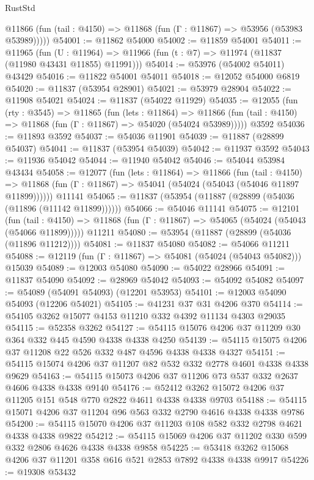 \begin{lexlean}{RustStd}
\begin{coremodule}
{\begin{coremodule}
{{{{{{{{{{{{{{{{{{{{{{{{{{{{{{{{{{{{{{{{{{{{{{{{{{      @11866 (fun (tail : @4150) => @11868 (fun (Γ : @11867) => @53956 (@53983 @53989)))))
@54001 := @11862 @54000
@54002 := @11859 @54001
@54011 := @11965
    (fun (U : @11964) => @11966 (fun (t : @7) => @11974 (@11837 (@11980 @43431 @11855) @11991)))
@54014 := @53976 (@54002 @54011) @43429
@54016 := @11822 @54001 @54011
@54018 := @12052 @54000 @6819
@54020 := @11837 (@53954 @28901)
@54021 := @53979 @28904
@54022 := @11908 @54021
@54024 := @11837 (@54022 @11929)
@54035 := @12055
    (fun (rty : @3545) =>
    @11865
      (fun (lets : @11864) =>
      @11866 (fun (tail : @4150) => @11868 (fun (Γ : @11867) => @54020 (@54024 @53989)))))
    @3592
@54036 := @11893 @3592
@54037 := @54036 @11901
@54039 := @11887 (@28899 @54037)
@54041 := @11837 (@53954 @54039)
@54042 := @11937 @3592
@54043 := @11936 @54042
@54044 := @11940 @54042
@54046 := @54044 @53984 @43434
@54058 := @12077
    (fun (lets : @11864) =>
    @11866
      (fun (tail : @4150) =>
      @11868 (fun (Γ : @11867) => @54041 (@54024 (@54043 (@54046 @11897 @11899))))))
    @11141
@54065 := @11837 (@53954 (@11887 (@28899 (@54036 (@11896 (@11142 @11899))))))
@54066 := @54046 @11141
@54075 := @12101
    (fun (tail : @4150) => @11868 (fun (Γ : @11867) => @54065 (@54024 (@54043 (@54066 @11899)))))
    @11211
@54080 := @53954 (@11887 (@28899 (@54036 (@11896 @11212))))
@54081 := @11837 @54080
@54082 := @54066 @11211
@54088 := @12119 (fun (Γ : @11867) => @54081 (@54024 (@54043 @54082))) @15039
@54089 := @12003 @54080
@54090 := @54022 @28966
@54091 := @11837 @54090
@54092 := @28969 @54042
@54093 := @54092 @54082
@54097 := @54089 (@54091 @54093) (@12201 @53953)
@54101 := @12003 @54090 @54093 (@12206 @54021)
@54105 := @41231 @37 @31 @4206 @370
@54114 := @54105 @3262 @15077 @4153 @11210 @332 @4392 @11134 @4303 @29035
@54115 := @52358 @3262
@54127 := @54115 @15076 @4206 @37 @11209 @30 @364 @332 @445 @4590 @4338 @4338 @4250
@54139 := @54115 @15075 @4206 @37 @11208 @22 @526 @332 @487 @4596 @4338 @4338 @4327
@54151 := @54115 @15074 @4206 @37 @11207 @82 @532 @332 @2778 @4601 @4338 @4338 @9629
@54163 := @54115 @15073 @4206 @37 @11206 @73 @537 @332 @2637 @4606 @4338 @4338 @9140
@54176 := @52412 @3262 @15072 @4206 @37 @11205 @151 @548 @770 @2822 @4611 @4338 @4338 @9703
@54188 := @54115 @15071 @4206 @37 @11204 @96 @563 @332 @2790 @4616 @4338 @4338 @9786
@54200 := @54115 @15070 @4206 @37 @11203 @108 @582 @332 @2798 @4621 @4338 @4338 @9822
@54212 := @54115 @15069 @4206 @37 @11202 @330 @599 @332 @2806 @4626 @4338 @4338 @9858
@54225 := @53418 @3262 @15068 @4206 @37 @11201 @358 @616 @521 @2853 @7892 @4338 @4338 @9917
@54226 := @19308 @53432
}}}}}}}}}}}}}}}}}}}}}}}}}}}}}}}}}}}}}}}}}}}}}}}}}}
\end{coremodule}}
\end{coremodule}
\end{lexlean}
